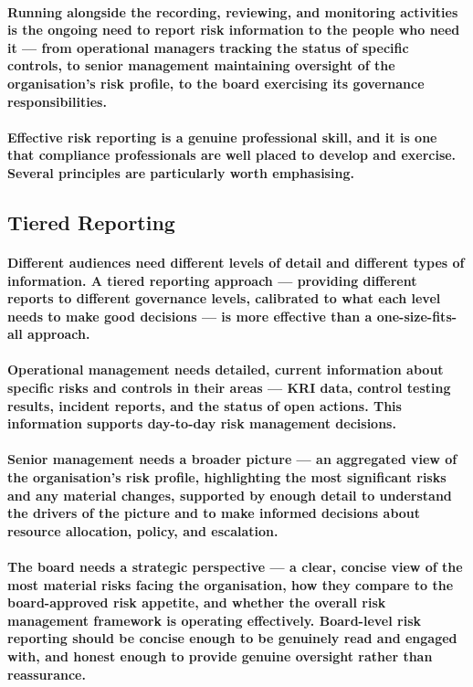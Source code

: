 \paragraph{Running alongside the recording, reviewing, and monitoring activities is the ongoing need to report risk information to the people who need it — from operational managers tracking the status of specific controls, to senior management maintaining oversight of the organisation's risk profile, to the board exercising its governance responsibilities.}
\paragraph{Effective risk reporting is a genuine professional skill, and it is one that compliance professionals are well placed to develop and exercise. Several principles are particularly worth emphasising.}

\subsection{Tiered Reporting}
\paragraph{Different audiences need different levels of detail and different types of information. A tiered reporting approach — providing different reports to different governance levels, calibrated to what each level needs to make good decisions — is more effective than a one-size-fits-all approach.}
\paragraph{\textbf{Operational management} needs detailed, current information about specific risks and controls in their areas — KRI data, control testing results, incident reports, and the status of open actions. This information supports day-to-day risk management decisions.}
\paragraph{\textbf{Senior management} needs a broader picture — an aggregated view of the organisation's risk profile, highlighting the most significant risks and any material changes, supported by enough detail to understand the drivers of the picture and to make informed decisions about resource allocation, policy, and escalation.}
\paragraph{\textbf{The board} needs a strategic perspective — a clear, concise view of the most material risks facing the organisation, how they compare to the board-approved risk appetite, and whether the overall risk management framework is operating effectively. Board-level risk reporting should be concise enough to be genuinely read and engaged with, and honest enough to provide genuine oversight rather than reassurance.}

